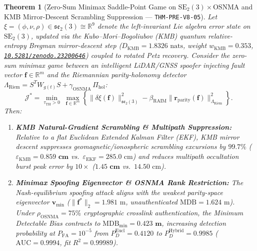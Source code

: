 \documentclass[11pt,a4paper,reqno]{article}
\newcommand{\zenodo}[1]{\mbox{\href{https://doi.org/10.5281/zenodo.#1}{\texttt{10.5281/zenodo.#1}}}}
\theoremstyle{plain}
\newtheorem{theorem}{Theorem}[section]
\theoremstyle{definition}
\theoremstyle{remark}
\numberwithin{equation}{section}
\begin{document}
\begin{theorem}[{Zero-Sum Minimax Saddle-Point Game on $\mathrm{SE}_2(3) \times \mathrm{OSNMA}$ and KMB Mirror-Descent Scrambling Suppression --- \texttt{THM-PRE-V8-05}}]\label{thm:adversarial_raim_game}
Let $\xi = (\phi, \nu, \rho) \in \mathfrak{se}_2(3) \cong \mathbb{R}^9$ denote the left-invariant Lie algebra error state on $\mathrm{SE}_2(3)$, updated via the Kubo--Mori--Bogoliubov (KMB) quantum relative-entropy Bregman mirror-descent step ($D_{\mathrm{KMB}} = 1.8326\text{ nats}$, weight $w_{\mathrm{KMB}} = 0.353$, \zenodo{23200646}) coupled to rotated Petz recovery. Consider the zero-sum minimax game between an intelligent LiDAR/GNSS spoofer injecting fault vector $\mathbf{f} \in \mathbb{R}^m$ and the Riemannian parity-holonomy detector $\Lambda_{\mathrm{Riem}} = S^T W_{g(t)} S + \gamma_{\mathrm{OSNMA}}\,\Pi_{\mathrm{hol}}$:
\begin{equation}\label{eq:minimax_game}
  \mathcal{J}^* = \min_{\tau_{\mathrm{TH}} > 0} \;\max_{\mathbf{f} \in \mathbb{R}^m} \left\{ \|\delta\xi(\mathbf{f})\|_{\mathfrak{se}_2(3)}^2 - \beta_{\mathrm{RAIM}} \|\mathbf{r}_{\mathrm{parity}}(\mathbf{f})\|_{\Lambda_{\mathrm{Riem}}}^2 \right\}.
\end{equation}
Then:
\begin{enumerate}[label=\textbf{(\arabic*)}, leftmargin=2.0em]
  \item \textbf{KMB Natural-Gradient Scrambling \& Multipath Suppression:} Relative to a flat Euclidean Extended Kalman Filter (EKF), KMB mirror descent suppresses geomagnetic/ionospheric scrambling excursions by $\bm{99.7\%}$ ($\varepsilon_{\mathrm{KMB}} = \bm{0.859\text{ cm}}$ vs.\ $\varepsilon_{\mathrm{EKF}} = 285.0\text{ cm}$) and reduces multipath occultation burst peak error by $10\times$ ($\bm{1.45\text{ cm}}$ vs.\ $14.50\text{ cm}$).
  \item \textbf{Minimax Spoofing Eigenvector \& OSNMA Rank Restriction:} The Nash-equilibrium spoofing attack aligns with the weakest parity-space eigenvector $\mathbf{v}_{\min}$ ($\|\mathbf{f}^*\|_2 = 1.981\text{ m}$, unauthenticated $\mathrm{MDB} = 1.624\text{ m}$). Under $\rho_{\mathrm{OSNMA}} = 75\%$ cryptographic crosslink authentication, the Minimum Detectable Bias contracts to $\mathrm{MDB}_{\min} = \bm{0.423\text{ m}}$, increasing detection probability at $P_{\mathrm{FA}} = 10^{-5}$ from $P_D^{\mathrm{Eucl}} = 0.4120$ to $P_D^{\mathrm{Hybrid}} = \bm{0.9985}$ ($\mathrm{AUC} = \bm{0.9994}$, fit $R^2 = 0.99989$).
\end{enumerate}
\end{theorem}
\end{document}
